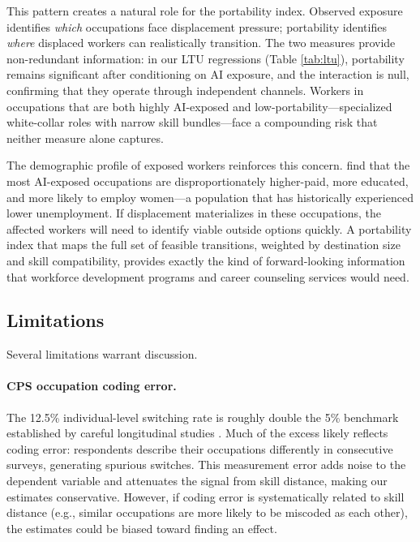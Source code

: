 \documentclass[12pt]{article}
\begin{document}
This pattern creates a natural role for the portability index. Observed exposure identifies \emph{which} occupations face displacement pressure; portability identifies \emph{where} displaced workers can realistically transition. The two measures provide non-redundant information: in our LTU regressions (Table \ref{tab:ltu}), portability remains significant after conditioning on AI exposure, and the interaction is null, confirming that they operate through independent channels. Workers in occupations that are both highly AI-exposed and low-portability---specialized white-collar roles with narrow skill bundles---face a compounding risk that neither measure alone captures.

The demographic profile of exposed workers reinforces this concern. \citet{massenkoff2026} find that the most AI-exposed occupations are disproportionately higher-paid, more educated, and more likely to employ women---a population that has historically experienced lower unemployment. If displacement materializes in these occupations, the affected workers will need to identify viable outside options quickly. A portability index that maps the full set of feasible transitions, weighted by destination size and skill compatibility, provides exactly the kind of forward-looking information that workforce development programs and career counseling services would need.

\subsection{Limitations}

Several limitations warrant discussion.

\paragraph{CPS occupation coding error.} The 12.5\% individual-level switching rate is roughly double the 5\% benchmark established by careful longitudinal studies \citep{kambourov2008}. Much of the excess likely reflects coding error: respondents describe their occupations differently in consecutive surveys, generating spurious switches. This measurement error adds noise to the dependent variable and attenuates the signal from skill distance, making our estimates conservative. However, if coding error is systematically related to skill distance (e.g., similar occupations are more likely to be miscoded as each other), the estimates could be biased toward finding an effect.
\end{document}
